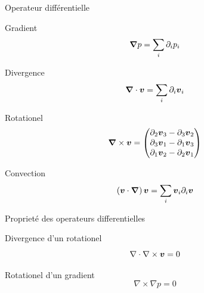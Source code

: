 \begin{frame}{Operateur différentielle}

\begin{block}{Gradient}
\begin{equation*}
 {\boldsymbol {\nabla}}p=\sum_{i}\partial_{i}p_{i}
\end{equation*}
\end{block}

\begin{block}{Divergence}
\begin{equation*}
 {\boldsymbol {\nabla}}\cdot {\boldsymbol {v}}=\sum_{i}\partial_{i}{\boldsymbol {v}}_{i}
\end{equation*}
\end{block}

\begin{block}{Rotationel}
\begin{equation*}
 {\boldsymbol {\nabla}} \times {\boldsymbol {v}}=\begin{pmatrix}
                                \partial_{2}{\boldsymbol {v}}_{3}-\partial_{3}{\boldsymbol {v}}_{2}\\
                                \partial_{3}{\boldsymbol {v}}_{1}-\partial_{1}{\boldsymbol {v}}_{3}\\
                                \partial_{1}{\boldsymbol {v}}_{2}-\partial_{2}{\boldsymbol {v}}_{1}\\
                               \end{pmatrix}
 \end{equation*}
\end{block}


\begin{block}{Convection}
\begin{equation*}
 \left({\boldsymbol {v}}\cdot {\boldsymbol {\nabla}}\right){\boldsymbol {v}}=\sum_{i} {\boldsymbol {v}}_{i}\partial_{i} {\boldsymbol {v}}
 \end{equation*}
\end{block}


\end{frame}
\begin{frame}{Proprieté des operateurs differentielles}
 \begin{property}{Divergence d'un rotationel}
  \begin{equation*}
  \nabla \cdot \nabla \times {\boldsymbol {v}}=0
  \end{equation*}
 \end{property}

 \begin{property}{Rotationel d'un gradient}
  \begin{equation*}
  \nabla \times \nabla p=0
  \end{equation*}
 \end{property}
\end{frame}
